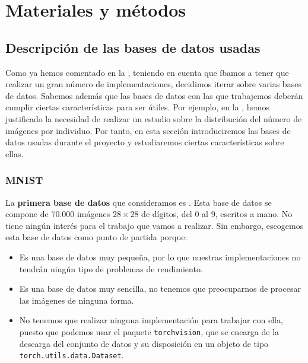 \chapter{Materiales y métodos} \label{ich:materiales_metodos}

\section{Descripción de las bases de datos usadas} \label{isec:base_datos_usada}

Como ya hemos comentado en la , teniendo en cuenta que íbamos a tener que realizar un gran número de implementaciones, decidimos iterar sobre varias bases de datos. Sabemos además que las bases de datos con las que trabajemos deberán cumplir ciertas características para ser útiles. Por ejemplo, en la , hemos justificado la necesidad de realizar un estudio sobre la distribución del número de imágenes por individuo. Por tanto, en esta sección introduciremos las bases de datos usadas durante el proyecto y estudiaremos ciertas características sobre ellas.

\subsection{MNIST}

La \textbf{primera base de datos} que consideramos es  \cite{informatica:mnist}. Esta base de datos se compone de 70.000 imágenes $28 \times 28$ de dígitos, del 0 al 9, escritos a mano. No tiene ningún interés para el trabajo que vamos a realizar. Sin embargo, escogemos esta base de datos como punto de partida porque:

\begin{itemize}
    \item Es una base de datos muy pequeña, por lo que nuestras implementaciones no tendrán ningún tipo de problemas de rendimiento.
    \item Es una base de datos muy sencilla, no tenemos que preocuparnos de procesar las imágenes de ninguna forma.
    \item No tenemos que realizar ninguna implementación para trabajar con ella, puesto que podemos usar el paquete \lstinline{torchvision}, que se encarga de la descarga del conjunto de datos y su disposición en un objeto de tipo \lstinline{torch.utils.data.Dataset}.
\end{itemize}

